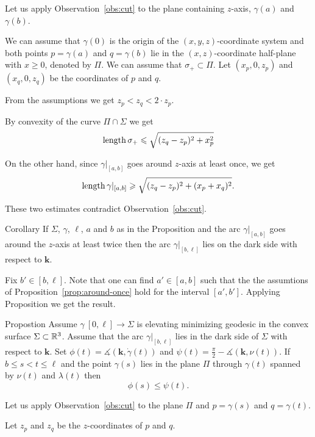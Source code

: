 \documentclass[a4paper,10pt]{amsart}
\begin{document}
Let us apply Observation~\ref{obs:cut} to the plane containing $z$-axis, $\gamma(a)$ and $\gamma(b)$.


We can assume that $\gamma(0)$ is the origin of the $(x,y,z)$-coordinate system
and both points $p=\gamma(a)$ and $q=\gamma(b)$ lie in the $(x,z)$-coordinate half-plane with $x\ge 0$, denoted by $\Pi$.
We can assume that $\sigma_+\subset \Pi$.
Let $(x_p,0,z_p)$ and $(x_q,0,z_q)$ be the coordinates of $p$ and $q$.

From the assumptions we get $z_p<z_q<2\cdot z_p$.

By convexity of the curve $\Pi\cap \Sigma$
we get 
\[\mathop{\rm length}\nolimits\sigma_+\leqslant \sqrt{(z_q-z_p)^2+x_p^2}\]

On the other hand, since $\gamma|_{[a,b]}$ goes around $z$-axis at least once,
we get 
\[\mathop{\rm length}\nolimits\gamma|_{[a,b]}\geqslant \sqrt{(z_q-z_p)^2+(x_p+x_q)^2}.\]

These two estimates contradict Observation~\ref{obs:cut}.
\qeds

\begin{thm}{Corollary}\label{cor:around-twice}
If $\Sigma$, $\gamma$, $\ell$, $a$ and $b$ as in the Proposition and the arc $\gamma|_{[a,b]}$ goes around the $z$-axis at least twice
then the arc $\gamma|_{[b,\ell]}$ lies on the dark side with respect to $\bm{k}$.
\end{thm}

Fix $b'\in [b,\ell]$.
Note that one can find $a'\in [a,b]$ such that the the assumtions of Proposition~\ref{prop:around-once} hold for the interval $[a',b']$. Applying Proposition we get the result.\qeds 


\begin{thm}{Propostion}\label{prop:phi-psi}
Assume $\gamma\:[0,\ell]\to \Sigma$ is elevating minimizing geodesic in the convex surface $\Sigma\subset \mathbb{R}^3$.
Assume that the arc $\gamma|_{[b,\ell]}$ lies in the dark side of $\Sigma$ with respect to $\bm{k}$.
Set $\phi(t)=\measuredangle(\bm{k},\dot\gamma(t))$ and $\psi(t)=\tfrac\pi2-\measuredangle(\bm{k},\nu(t))$.
If $b\le s<t\le \ell$ and the point $\gamma(s)$ lies in the plane $\Pi$ through $\gamma(t)$ spanned by $\nu(t)$ and $\lambda(t)$
then 
\[\phi(s)\le \psi(t).\]
\end{thm}

Let us apply Observation~\ref{obs:cut} to the plane $\Pi$ and $p=\gamma(s)$ and $q=\gamma(t)$.

Let $z_p$ and $z_q$ be the $z$-coordinates of $p$ and $q$.
\end{document}
